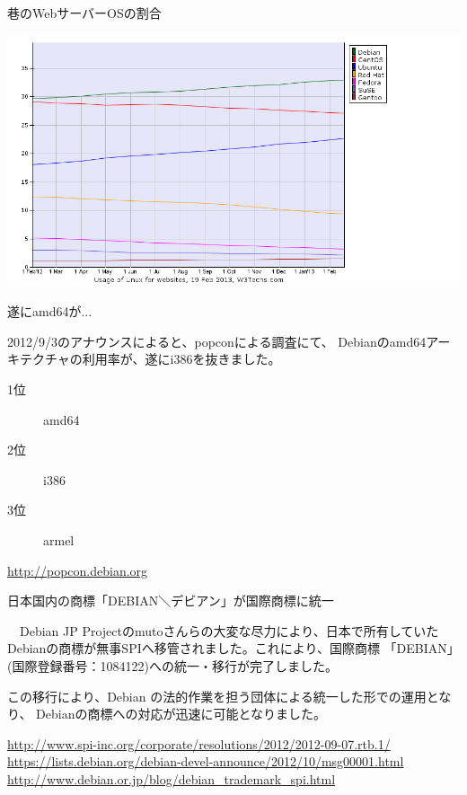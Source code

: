 \begin{frame}{巷のWebサーバーOSの割合}
\begin{center}
\includegraphics[width=1.0\hsize]{image201302/osc-tokyo/w3techs-graph.png}
\end{center}
\end{frame}

\begin{frame}{遂にamd64が...}

2012/9/3のアナウンスによると、popconによる調査にて、
Debianのamd64アーキテクチャの利用率が、遂にi386を抜きました。

\begin{description}
\item [1位] amd64
\item [2位] i386
\item [3位] armel
\end{description}

\url{http://popcon.debian.org}

\end{frame}

\begin{frame}{日本国内の商標「DEBIAN＼デビアン」が国際商標に統一}

　Debian JP Projectのmutoさんらの大変な尽力により、日本で所有していた
Debianの商標が無事SPIへ移管されました。これにより、国際商標
「DEBIAN」(国際登録番号：1084122)への統一・移行が完了しました。

この移行により、Debian の法的作業を担う団体による統一した形での運用となり、
Debianの商標への対応が迅速に可能となりました。

\url{http://www.spi-inc.org/corporate/resolutions/2012/2012-09-07.rtb.1/}\\
\url{https://lists.debian.org/debian-devel-announce/2012/10/msg00001.html}\\
\url{http://www.debian.or.jp/blog/debian_trademark_spi.html}
\end{frame}

